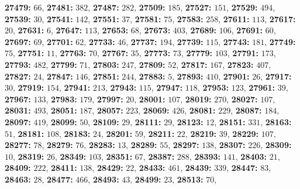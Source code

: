 \textsf{\bfseries 27479:} $66$, \textsf{\bfseries 27481:} $382$, \textsf{\bfseries 27487:} $282$, \textsf{\bfseries 27509:} $185$, \textsf{\bfseries 27527:} $151$, \textsf{\bfseries 27529:} $494$, \textsf{\bfseries 27539:} $30$, \textsf{\bfseries 27541:} $142$, \textsf{\bfseries 27551:} $37$, \textsf{\bfseries 27581:} $75$, \textsf{\bfseries 27583:} $258$, \textsf{\bfseries 27611:} $113$, \textsf{\bfseries 27617:} $20$, \textsf{\bfseries 27631:} $6$, \textsf{\bfseries 27647:} $113$, \textsf{\bfseries 27653:} $68$, \textsf{\bfseries 27673:} $403$, \textsf{\bfseries 27689:} $106$, \textsf{\bfseries 27691:} $60$, \textsf{\bfseries 27697:} $69$, \textsf{\bfseries 27701:} $62$, \textsf{\bfseries 27733:} $46$, \textsf{\bfseries 27737:} $194$, \textsf{\bfseries 27739:} $115$, \textsf{\bfseries 27743:} $181$, \textsf{\bfseries 27749:} $75$, \textsf{\bfseries 27751:} $11$, \textsf{\bfseries 27763:} $70$, \textsf{\bfseries 27767:} $35$, \textsf{\bfseries 27773:} $73$, \textsf{\bfseries 27779:} $103$, \textsf{\bfseries 27791:} $173$, \textsf{\bfseries 27793:} $482$, \textsf{\bfseries 27799:} $71$, \textsf{\bfseries 27803:} $247$, \textsf{\bfseries 27809:} $52$, \textsf{\bfseries 27817:} $167$, \textsf{\bfseries 27823:} $407$, \textsf{\bfseries 27827:} $24$, \textsf{\bfseries 27847:} $146$, \textsf{\bfseries 27851:} $244$, \textsf{\bfseries 27883:} $5$, \textsf{\bfseries 27893:} $410$, \textsf{\bfseries 27901:} $26$, \textsf{\bfseries 27917:} $30$, \textsf{\bfseries 27919:} $154$, \textsf{\bfseries 27941:} $213$, \textsf{\bfseries 27943:} $115$, \textsf{\bfseries 27947:} $118$, \textsf{\bfseries 27953:} $123$, \textsf{\bfseries 27961:} $39$, \textsf{\bfseries 27967:} $133$, \textsf{\bfseries 27983:} $179$, \textsf{\bfseries 27997:} $20$, \textsf{\bfseries 28001:} $107$, \textsf{\bfseries 28019:} $270$, \textsf{\bfseries 28027:} $107$, \textsf{\bfseries 28031:} $493$, \textsf{\bfseries 28051:} $187$, \textsf{\bfseries 28057:} $223$, \textsf{\bfseries 28069:} $426$, \textsf{\bfseries 28081:} $229$, \textsf{\bfseries 28087:} $184$, \textsf{\bfseries 28097:} $419$, \textsf{\bfseries 28099:} $50$, \textsf{\bfseries 28109:} $29$, \textsf{\bfseries 28111:} $29$, \textsf{\bfseries 28123:} $12$, \textsf{\bfseries 28151:} $331$, \textsf{\bfseries 28163:} $51$, \textsf{\bfseries 28181:} $108$, \textsf{\bfseries 28183:} $24$, \textsf{\bfseries 28201:} $59$, \textsf{\bfseries 28211:} $22$, \textsf{\bfseries 28219:} $39$, \textsf{\bfseries 28229:} $107$, \textsf{\bfseries 28277:} $78$, \textsf{\bfseries 28279:} $76$, \textsf{\bfseries 28283:} $13$, \textsf{\bfseries 28289:} $55$, \textsf{\bfseries 28297:} $138$, \textsf{\bfseries 28307:} $226$, \textsf{\bfseries 28309:} $10$, \textsf{\bfseries 28319:} $26$, \textsf{\bfseries 28349:} $103$, \textsf{\bfseries 28351:} $67$, \textsf{\bfseries 28387:} $288$, \textsf{\bfseries 28393:} $141$, \textsf{\bfseries 28403:} $21$, \textsf{\bfseries 28409:} $222$, \textsf{\bfseries 28411:} $138$, \textsf{\bfseries 28429:} $22$, \textsf{\bfseries 28433:} $461$, \textsf{\bfseries 28439:} $339$, \textsf{\bfseries 28447:} $83$, \textsf{\bfseries 28463:} $28$, \textsf{\bfseries 28477:} $466$, \textsf{\bfseries 28493:} $43$, \textsf{\bfseries 28499:} $23$, \textsf{\bfseries 28513:} $70$, 
